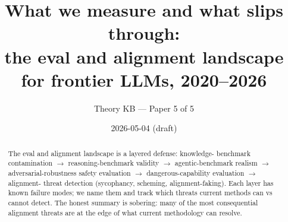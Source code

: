 








\title{
  What we measure and what slips through: \\
  the eval and alignment landscape for frontier LLMs, 2020--2026
}
\author{Theory KB --- Paper 5 of 5}
\date{2026-05-04 (draft)}


\maketitle

\begin{abstract}
The eval and alignment landscape is a layered defense: knowledge-
benchmark contamination $\to$ reasoning-benchmark validity $\to$
agentic-benchmark realism $\to$ adversarial-robustness safety
evaluation $\to$ dangerous-capability evaluation $\to$ alignment-
threat detection (sycophancy, scheming, alignment-faking). Each
layer has known failure modes; we name them and track which threats
current methods can vs cannot detect. The honest summary is sobering:
many of the most consequential alignment threats are at the edge of
what current methodology can resolve.
\end{abstract}

\tableofcontents




















